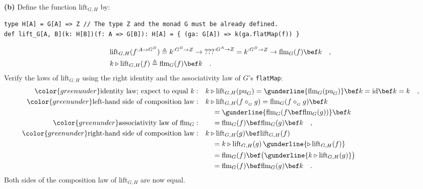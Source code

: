 \textbf{(b)} Define the function $\text{lift}_{G,H}$ by:
\begin{lstlisting}
type H[A] = G[A] => Z // The type Z and the monad G must be already defined.
def lift_G[A, B](k: H[B])(f: A => G[B]): H[A] = { (ga: G[A]) => k(ga.flatMap(f)) }
\end{lstlisting}
\begin{align*}
 & \text{lift}_{G,H}(f^{:A\rightarrow G^{B}})\triangleq k^{:G^{B}\rightarrow Z}\rightarrow\text{???}^{:G^{A}\rightarrow Z}=k^{:G^{B}\rightarrow Z}\rightarrow\text{flm}_{G}(f)\bef k\quad,\\
 & k\triangleright\text{lift}_{G,H}(f)\triangleq\text{flm}_{G}(f)\bef k\quad.
\end{align*}
Verify the laws of $\text{lift}_{G,H}$ using the right identity and
the associativity law of $G$\textsf{'}s \lstinline!flatMap!:
\begin{align*}
{\color{greenunder}\text{identity law; expect to equal }k:}\quad & k\triangleright\text{lift}_{G,H}(\text{pu}_{G})=\gunderline{\text{flm}_{G}(\text{pu}_{G})}\bef k=\text{id}\bef k=k\quad,\\
{\color{greenunder}\text{left-hand side of composition law}:}\quad & k\triangleright\text{lift}_{G,H}(f\diamond_{_{G}}g)=\text{flm}_{G}(f\diamond_{_{G}}g)\bef k\\
 & \quad=\gunderline{\text{flm}_{G}(f\bef\text{flm}_{G}(g))}\bef k\\
{\color{greenunder}\text{associativity law of }\text{flm}_{G}:}\quad & \quad=\text{flm}_{G}(f)\bef\text{flm}_{G}(g)\bef k\quad,\\
{\color{greenunder}\text{right-hand side of composition law}:}\quad & k\triangleright\text{lift}_{G,H}(g)\bef\text{lift}_{G,H}(f)\\
 & \quad=k\triangleright\text{lift}_{G,H}(g)\,\gunderline{\triangleright\,\text{lift}_{G,H}(f)}\\
 & \quad=\text{flm}_{G}(f)\bef\big(\gunderline{k\triangleright\text{lift}_{G,H}(g)}\big)\\
 & \quad=\text{flm}_{G}(f)\bef\text{flm}_{G}(g)\bef k\quad.
\end{align*}
Both sides of the composition law of $\text{lift}_{G,H}$ are now
equal.

